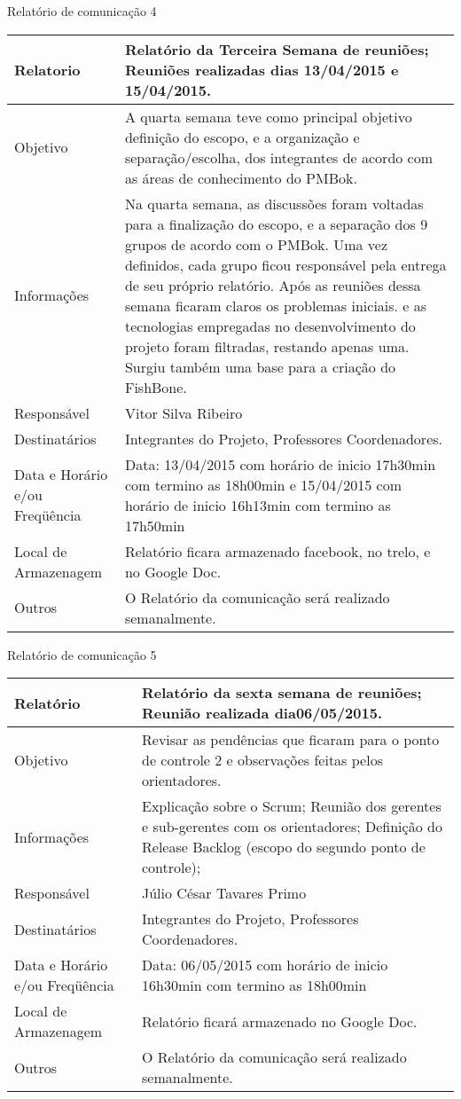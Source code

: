 \begin{center}
{\large Relatório de comunicação 4}
\begin{table}[h]
\begin{tabular}{|p{6cm}|p{9cm}|}\hline
Relatorio & Relatório da Terceira Semana de reuniões; Reuniões realizadas dias 13/04/2015 e 15/04/2015.\\ \hline
Objetivo & A quarta semana teve como principal objetivo definição do escopo, e a organização e separação/escolha, dos integrantes de acordo com as áreas de conhecimento do PMBok.\\ \hline
Informações & Na quarta semana, as discussões foram voltadas para a finalização do escopo, e a separação dos 9 grupos de acordo com o PMBok. Uma vez definidos, cada grupo ficou responsável pela entrega de seu próprio relatório.
Após as reuniões dessa semana ficaram claros os problemas iniciais. e as tecnologias empregadas no desenvolvimento do projeto foram filtradas, restando apenas uma.
Surgiu também uma base para a criação do FishBone.\\ \hline
Responsável & Vitor Silva Ribeiro\\ \hline
Destinatários & Integrantes do Projeto, Professores Coordenadores.\\ \hline
Data e Horário e/ou Freqüência & Data: 13/04/2015 com horário de inicio 17h30min com termino as 18h00min e 15/04/2015 com horário de inicio 16h13min com  termino as 17h50min\\ \hline
Local de Armazenagem & Relatório ficara armazenado facebook, no trelo, e no Google Doc.\\ \hline
Outros & O Relatório da comunicação será realizado semanalmente.\\ \hline
\end{tabular}
\end{table}
\FloatBarrier

{\large Relatório de comunicação 5}
\begin{table}[h]
\begin{tabular}{|p{6cm}|p{9cm}|}\hline
Relatório&Relatório da sexta semana de reuniões; Reunião realizada dia06/05/2015.\\ \hline
Objetivo&Revisar as pendências que ficaram para o ponto de controle 2 e observações feitas pelos orientadores.\\ \hline
Informações&	Explicação sobre o Scrum; Reunião dos gerentes e sub-gerentes com os orientadores;
Definição do Release Backlog (escopo do segundo ponto de controle);\\ \hline
Responsável	&Júlio César Tavares Primo\\ \hline
Destinatários&Integrantes do Projeto, Professores Coordenadores.\\ \hline
Data e Horário e/ou Freqüência& Data: 06/05/2015 com horário de inicio 16h30min com termino as 18h00min\\ \hline
Local de Armazenagem&Relatório ficará armazenado no Google Doc.\\ \hline
Outros&	O Relatório da comunicação será realizado semanalmente.\\ \hline
\end{tabular}
\end{table}
\FloatBarrier



\end{center}
